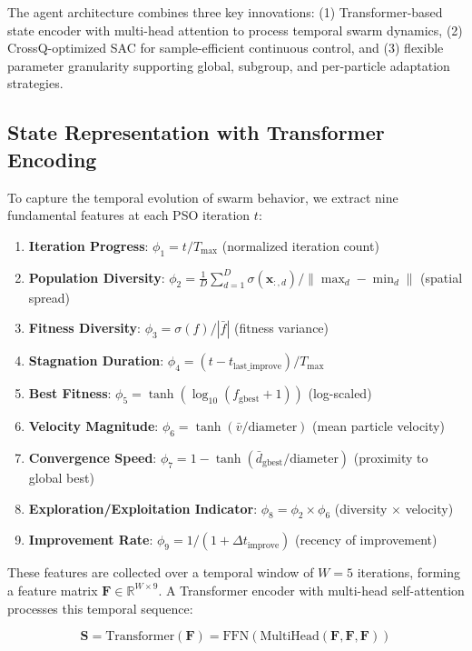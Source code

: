 \documentclass[fleqn,10pt]{wlscirep}
\begin{document}
The agent architecture combines three key innovations: (1) Transformer-based state encoder with multi-head attention to process temporal swarm dynamics, (2) CrossQ-optimized SAC for sample-efficient continuous control, and (3) flexible parameter granularity supporting global, subgroup, and per-particle adaptation strategies.

\subsection*{State Representation with Transformer Encoding}

To capture the temporal evolution of swarm behavior, we extract nine fundamental features at each PSO iteration $t$:

\begin{enumerate}
\item \textbf{Iteration Progress}: $\phi_1 = t / T_{\max}$ (normalized iteration count)
\item \textbf{Population Diversity}: $\phi_2 = \frac{1}{D} \sum_{d=1}^{D} \sigma(\mathbf{x}_{:,d}) / \|\max_d - \min_d\|$ (spatial spread)
\item \textbf{Fitness Diversity}: $\phi_3 = \sigma(f) / |\bar{f}|$ (fitness variance)
\item \textbf{Stagnation Duration}: $\phi_4 = (t - t_{\text{last\_improve}}) / T_{\max}$
\item \textbf{Best Fitness}: $\phi_5 = \tanh(\log_{10}(f_{\text{gbest}} + 1))$ (log-scaled)
\item \textbf{Velocity Magnitude}: $\phi_6 = \tanh(\bar{v} / \text{diameter})$ (mean particle velocity)
\item \textbf{Convergence Speed}: $\phi_7 = 1 - \tanh(\bar{d}_{\text{gbest}} / \text{diameter})$ (proximity to global best)
\item \textbf{Exploration/Exploitation Indicator}: $\phi_8 = \phi_2 \times \phi_6$ (diversity $\times$ velocity)
\item \textbf{Improvement Rate}: $\phi_9 = 1/(1 + \Delta t_{\text{improve}})$ (recency of improvement)
\end{enumerate}

These features are collected over a temporal window of $W=5$ iterations, forming a feature matrix $\mathbf{F} \in \mathbb{R}^{W \times 9}$.
A Transformer encoder with multi-head self-attention processes this temporal sequence:

\begin{equation}
\mathbf{S} = \text{Transformer}(\mathbf{F}) = \text{FFN}(\text{MultiHead}(\mathbf{F}, \mathbf{F}, \mathbf{F}))
\label{eq:transformer}
\end{equation}
\end{document}

